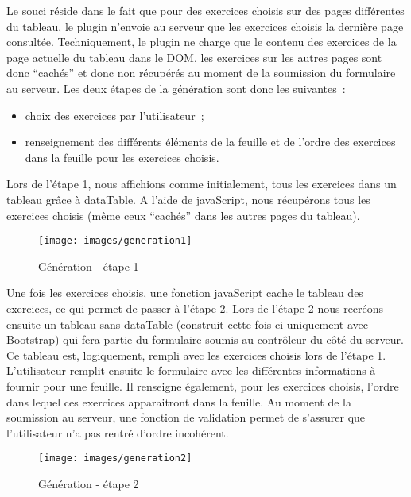 Le souci réside dans le fait que pour des exercices choisis sur des pages différentes du tableau, le plugin n'envoie au serveur que les exercices choisis la dernière page consultée. Techniquement, le plugin ne charge que le contenu des exercices de la page actuelle du tableau 
dans le DOM, les exercices sur les autres pages sont donc \enquote{cachés} et donc non récupérés au moment de la soumission du formulaire au serveur. Les deux étapes de la génération sont donc les suivantes~:
\smallskip
\begin{itemize}
\item choix des exercices par l'utilisateur~;
\item renseignement des différents éléments de la feuille et de l'ordre des exercices dans la feuille pour les exercices choisis.
\end{itemize}

\smallskip
Lors de l'étape 1, nous affichions comme initialement, tous les exercices dans un tableau grâce à dataTable. A l'aide de javaScript, nous récupérons tous les exercices choisis (même ceux \enquote{cachés} dans les autres pages du tableau).

\begin{figure}[!hH]
\begin{center}
\texttt{[image: images/generation1]}
\caption{Génération - étape 1}
\end{center}
\end{figure}

Une fois les exercices choisis, une fonction javaScript cache le tableau des exercices, ce qui permet de passer à l'étape 2. Lors de l'étape 2 nous recréons ensuite un tableau sans dataTable (construit cette fois-ci uniquement avec Bootstrap) qui fera partie du formulaire soumis au contrôleur du côté du serveur. Ce tableau est, logiquement, rempli avec les exercices choisis lors de l'étape 1. L'utilisateur remplit ensuite le formulaire avec les différentes informations à fournir pour une feuille. Il renseigne également, pour les exercices choisis, l'ordre dans lequel ces exercices apparaitront dans la feuille. Au moment de la soumission au serveur, une fonction de validation permet de s'assurer que l'utilisateur n'a pas rentré d'ordre incohérent.

\begin{figure}[!hH]
\begin{center}
\texttt{[image: images/generation2]}
\caption{Génération - étape 2}
\end{center}
\end{figure}

